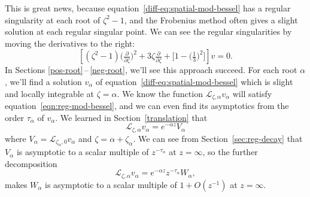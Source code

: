 \documentclass{article}
\newcommand{\fracderiv}[3]{\partial^{#1}_{#2, #3}}
\newcommand{\laplace}{\mathcal{L}}
\theoremstyle{definition}
\theoremstyle{plain}
\begin{document}
{This is great news, because equation~\eqref{diff-eq:spatial-mod-bessel} has a regular singularity at each root of $\zeta^2 - 1$, and the Frobenius method often gives a slight solution at each regular singular point. We can see the regular singularities by moving the derivatives to the right:
\[ \left[ (\zeta^2 - 1) \big(\tfrac{\partial}{\partial \zeta}\big)^2 + 3\zeta \tfrac{\partial}{\partial \zeta} + \big[ 1 - \big(\tfrac{1}{3}\big)^2 \big] \right] v = 0. \]
In Sections \ref{pos-root}\,--\,\ref{neg-root}, we’ll see this approach succeed. For each root $\alpha$, we'll find a solution $v_\alpha$ of equation~\eqref{diff-eq:spatial-mod-bessel} which is slight and locally integrable at $\zeta = \alpha$. We know the function $\laplace_{\zeta, \alpha} v_\alpha$ will satisfy equation~\eqref{eqn:reg-mod-bessel}, and we can even find its asymptotics from the order $\tau_\alpha$ of $v_\alpha$. We learned in Section~\ref{translation} that
\[ \laplace_{\zeta, \alpha} v_\alpha = e^{-\alpha z} V_\alpha \]
where $V_\alpha = \laplace_{\zeta_\alpha, 0} v_\alpha$ and $\zeta = \alpha + \zeta_\alpha$. We can see from Section~\ref{sec:reg-decay} that $V_\alpha$ is asymptotic to a scalar multiple of $z^{ - \tau_\alpha}$ at $z = \infty$, so the further decomposition
\[ \laplace_{\zeta, \alpha} v_\alpha = e^{-\alpha z} z^{-\tau_\alpha} W_\alpha, \]
makes $W_\alpha$ is asymptotic to a scalar multiple of $1+O(z^{-1})$ at $z = \infty$.
}
\end{document}
